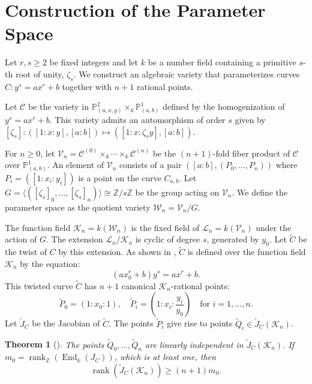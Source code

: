 \documentclass[11pt, a4paper]{amsart}
\newtheorem{thm}{Theorem}[section]
\theoremstyle{definition}
\newcommand{\Z}{\mathbb{Z}}
\newcommand{\Pp}{\mathbb{P}}
\newcommand{\Cc}{\mathcal{C}}
\newcommand{\Vc}{\mathcal{V}}
\newcommand{\Wc}{\mathcal{W}}
\newcommand{\Ll}{\mathcal{L}}
\newcommand{\KK}{\mathcal{K}}
\DeclareMathOperator{\rk}{rank}
\DeclareMathOperator{\enn}{End}
\begin{document}
\section{Construction of the Parameter Space}
\label{rpavff}

Let $r, s \geq 2$ be fixed integers and let $k$ be a number field containing a primitive $s$-th root of unity, $\zeta_s$. We construct an algebraic variety that parameterizes curves $C: y^s=ax^r+b$ together with $n+1$ rational points.

Let $\Cc$ be the variety in $\Pp^2_{(u,x,y)} \times_k \Pp^1_{(a,b)}$ defined by the homogenization of $y^s = ax^r+b$. This variety admits an automorphism of order $s$ given by $[\zeta_s]: ([1:x:y], [a:b]) \mapsto ([1:x:\zeta_s y], [a:b])$.

For $n \ge 0$, let $\Vc_n = \Cc^{(0)} \times_k \cdots \times_k \Cc^{(n)}$ be the $(n+1)$-fold fiber product of $\Cc$ over $\Pp^1_{(a,b)}$. An element of $\Vc_n$ consists of a pair $([a:b], (P_0, \dots, P_n))$ where $P_i=([1:x_i:y_i])$ is a point on the curve $C_{a,b}$. Let $G = \langle ([\zeta_s]_0, \dots, [\zeta_s]_n) \rangle \cong \Z/s\Z$ be the group acting on $\Vc_n$. We define the parameter space as the quotient variety $\Wc_n = \Vc_n/G$.

The function field $\KK_n = k(\Wc_n)$ is the fixed field of $\Ll_n = k(\Vc_n)$ under the action of $G$. The extension $\Ll_n/\KK_n$ is cyclic of degree $s$, generated by $y_0$. Let $\widetilde{C}$ be the twist of $C$ by this extension. As shown in \cite{Hazama1991}, $\widetilde{C}$ is defined over the function field $\KK_n$ by the equation:
\begin{equation} \label{twist}
	(ax_0^r+b)y^s = ax^r+b.
\end{equation}
This twisted curve $\widetilde{C}$ has $n+1$ canonical $\KK_n$-rational points:
\begin{equation} \label{Kpoint}
	\widetilde{P}_0 = (1:x_0:1), \quad \widetilde{P}_i = \left(1:x_i:\frac{y_i}{y_0}\right) \quad \text{for } i=1,\dots,n.
\end{equation}
Let $\widetilde{J}_C$ be the Jacobian of $\widetilde{C}$. The points $\widetilde{P}_i$ give rise to points $\widetilde{Q}_i \in \widetilde{J}_C(\KK_n)$.

\begin{thm}[\cite{Salami2019}]
	\label{main3}
	The points $\widetilde{Q}_0, \dots, \widetilde{Q}_n$ are linearly independent in $\widetilde{J}_C(\KK_n)$. If $m_0 = \rk_\Z(\enn_k(J_C))$, which is at least one, then
	\[ \rk(\widetilde{J}_C(\KK_n)) \geq (n+1)m_0. \]
\end{thm}
\end{document}
